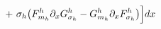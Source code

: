 \documentclass[preview]{standalone}
\newcommand{\dx}{\partial_x}
\begin{document}
\begin{align*}
\special{dvisvgm:raw <g id='unique000'>}+\ \sigma_h\big(F^h_{m_h}\dx G^h_{\sigma_h}-G^h_{m_h}\dx F^h_{\sigma_h}\big)\Big]dx\special{dvisvgm:raw </g>}
\end{align*}
\end{document}
